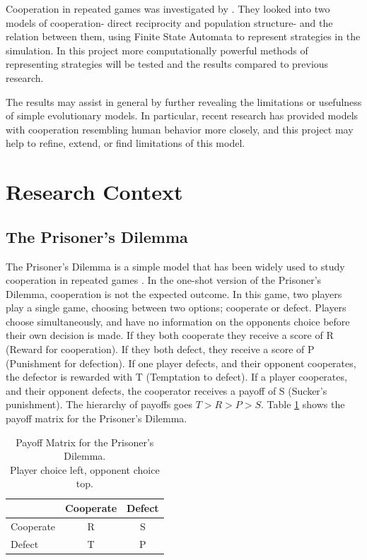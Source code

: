 \documentclass[a4paper,11pt,bcshonoursthesis,singlespace,twoside]{cssethesis}
\begin{document}
Cooperation in repeated games was investigated by \citet{van-veelen:PNAS:2012}. 
They looked into two models of cooperation- direct reciprocity and population structure- and the relation between them, using Finite State Automata to represent strategies in the simulation. 
In this project more computationally powerful methods of representing strategies will be tested and the results compared to previous research.

The results may assist in general by further revealing the limitations or usefulness of simple evolutionary models. 
In particular, recent research has provided models with cooperation resembling human behavior more closely, and this project may help to refine, extend, or find limitations of this model.

\section{Research Context}
\subsection{The Prisoner's Dilemma}
The Prisoner's Dilemma is a simple model that has been widely used to study cooperation in repeated games \citep{Axelrod1997}. 
In the one-shot version of the Prisoner's Dilemma, cooperation is not the expected outcome. 
In this game, two players play a single game, choosing between two options; cooperate or defect. 
Players choose simultaneously, and have no information on the opponents choice before their own decision is made. 
If they both cooperate they receive a score of R (Reward for cooperation). 
If they both defect, they receive a score of P (Punishment for defection). 
If one player defects, and their opponent cooperates, the defector is rewarded with T (Temptation to defect). 
If a player cooperates, and their opponent defects, the cooperator receives a payoff of S (Sucker's punishment). 
The hierarchy of payoffs goes $T>R>P>S$. Table \ref{table:payoffs} shows the payoff matrix for the Prisoner's Dilemma. 
\begin{table}[h]\centering
\captionsetup{justification=centering}
\begin{tabular}{|l|c|c|}
\hline
 & Cooperate & Defect\\
\hline
Cooperate & R & S\\
\hline
Defect & T  & P \\
\hline
\end{tabular}
\caption{Payoff Matrix for the Prisoner's Dilemma.\\ Player choice left, opponent choice top.}
\label{table:payoffs}
\end{table}
\end{document}
